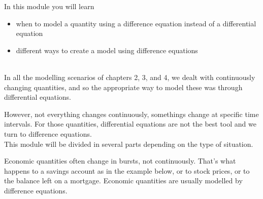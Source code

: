 In this module you will learn
\begin{itemize}
	\item when to model a quantity using a difference equation instead of a differential equation
	\item different ways to create a model using difference equations
\end{itemize}

\hfill \\

In all the modelling scenarios of chapters 2, 3, and 4, we dealt with continuously changing quantities, and so the appropriate way to model these was through differential equations.

However, not everything changes continuously, somethings change at specific time intervals. For those quantities, differential equations are not the best tool and we turn to difference equations. \\

This module will be divided in several parts depending on the type of situation. \\





Economic quantities often change in bursts, not continuously. That's what happens to a savings account as in the example below, or to stock prices, or to the balance left on a mortgage.
Economic quantities are usually modelled by difference equations.



